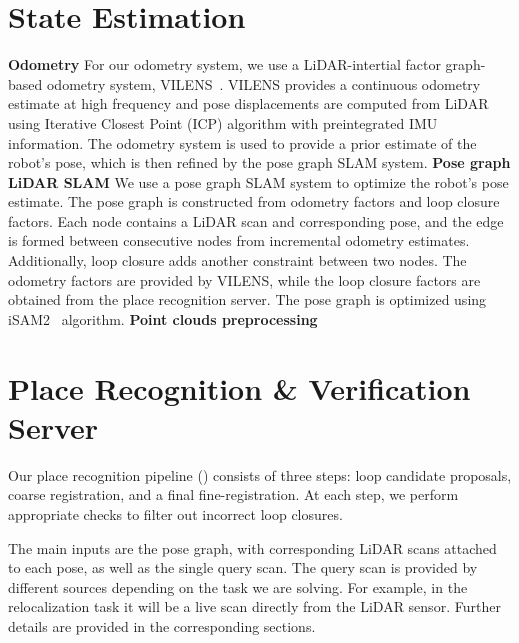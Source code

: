 \section{State Estimation}
\textbf{Odometry} \hspace{0.5em} For our odometry system, we use a LiDAR-intertial factor graph-based odometry system, VILENS~\cite{wisth2023tro}. VILENS provides a continuous odometry estimate at high frequency and pose displacements are computed from LiDAR using Iterative Closest Point (ICP) algorithm with preintegrated IMU information. The odometry system is used to provide a prior estimate of the robot's pose, which is then refined by the pose graph SLAM system. 
\newline
\textbf{Pose graph LiDAR SLAM} \hspace{0.5em} We use a pose graph SLAM system to optimize the robot's pose estimate. The pose graph is constructed from odometry factors and loop closure factors. Each node contains a LiDAR scan and corresponding pose, and the edge is formed between consecutive nodes from incremental odometry estimates. Additionally, loop closure adds another constraint between two nodes. The odometry factors are provided by VILENS, while the loop closure factors are obtained from the place recognition server. The pose graph is optimized using iSAM2~\cite{Kaess2012} algorithm. 
\newline
\textbf{Point clouds preprocessing}

\section{Place Recognition \& Verification Server} \label{sec:pipeline}
Our place recognition pipeline () consists of three steps: loop candidate proposals, coarse registration, and a final fine-registration. At each step, we perform appropriate checks to filter out incorrect loop closures.

The main inputs are the pose graph, with corresponding LiDAR scans attached to each pose, as well as the single query scan. The query scan is provided by different sources depending on the task we are solving. For example, in the relocalization task it will be a live scan directly from the LiDAR sensor. Further details are provided in the corresponding sections.

